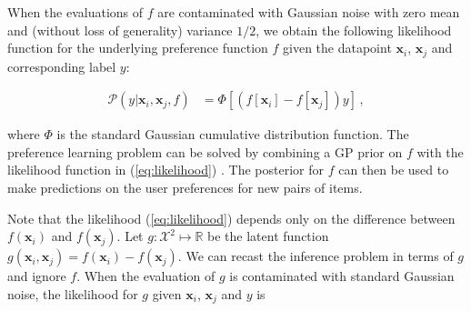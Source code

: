 When the evaluations of $f$ are contaminated with Gaussian noise with zero mean and (without loss of generality) variance $1/2$, we obtain the following likelihood function for the underlying preference function $f$ given the datapoint $\mathbf{x}_i$, $\mathbf{x}_j$ and corresponding label $y$:

\vspace{-0.65cm}
{\small
\begin{align}
\mathcal{P}(y|\mathbf{x}_i,\mathbf{x}_j,f) &= \Phi[(f[\mathbf{x}_i] - f[\mathbf{x}_j])y]\,,\label{eq:likelihood}
\end{align}
}

\vspace{-0.7cm}
\normalsize where $\Phi$ is the standard Gaussian cumulative distribution function. The preference learning problem can be solved by combining a GP prior on $f$ with the likelihood function in (\ref{eq:likelihood}) \cite{chu2005}. The posterior for $f$ can
then be used to make predictions on the user preferences for new pairs of items.

Note that the likelihood (\ref{eq:likelihood}) depends only on the difference between $f(\mathbf{x}_i)$ and $f(\mathbf{x}_j)$.
Let $g:\mathcal{X}^2\mapsto\mathbb{R}$ be the latent function $g(\mathbf{x}_i,\mathbf{x}_j) = f(\mathbf{x}_i) - f(\mathbf{x}_j)$.
We can recast the inference problem in terms of $g$ and ignore $f$. When the evaluation of $g$ is contaminated with standard Gaussian noise,
the likelihood for $g$ given $\mathbf{x}_i$, $\mathbf{x}_j$ and $y$ is

